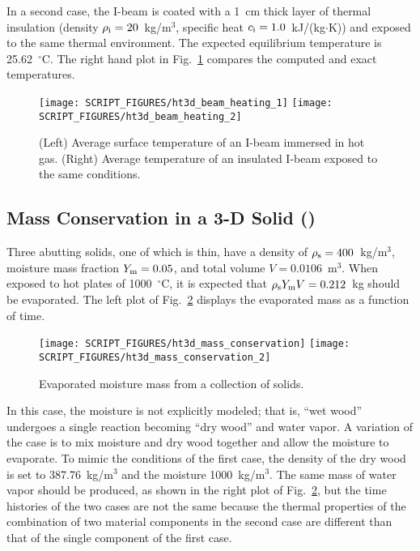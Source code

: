 \documentclass[11pt]{book}
\begin{document}
In a second case, the I-beam is coated with a 1~cm thick layer of thermal insulation (density $\rho_{\rm i}=20$~kg/m$^3$, specific heat $c_{\rm i}=1.0$~kJ/(kg$\cdot$K)) and exposed to the same thermal environment. The expected equilibrium temperature is 25.62~$^\circ$C. The right hand plot in Fig.~\ref{fig:ht3d_beam_heating} compares the computed and exact temperatures.

\begin{figure}[ht]
\texttt{[image: SCRIPT\_FIGURES/ht3d\_beam\_heating\_1]}
\texttt{[image: SCRIPT\_FIGURES/ht3d\_beam\_heating\_2]}
\caption[The  test cases]{(Left) Average surface temperature of an I-beam immersed in hot gas. (Right) Average temperature of an insulated I-beam exposed to the same conditions.}
\label{fig:ht3d_beam_heating}
\end{figure}

\FloatBarrier


\subsection{Mass Conservation in a 3-D Solid (\texorpdfstring{}{ht3d\_mass\_conservation})}
\label{ht3d_mass_conservation}

Three abutting solids, one of which is thin, have a density of $\rho_{\rm s}=400$~kg/m$^3$, moisture mass fraction $Y_{\rm m}=0.05$, and total volume $V=0.0106$~m$^3$. When exposed to hot plates of 1000~$^\circ$C, it is expected that $\rho_{\rm s} Y_{\rm m} V=0.212$~kg should be evaporated. The left plot of Fig.~\ref{fig:ht3d_mass_conservation} displays the evaporated mass as a function of time.

\begin{figure}[ht]
\texttt{[image: SCRIPT\_FIGURES/ht3d\_mass\_conservation]}
\texttt{[image: SCRIPT\_FIGURES/ht3d\_mass\_conservation\_2]}
\caption[The  test case]{Evaporated moisture mass from a collection of solids.}
\label{fig:ht3d_mass_conservation}
\end{figure}

In this case, the moisture is not explicitly modeled; that is, ``wet wood'' undergoes a single reaction becoming ``dry wood'' and water vapor. A variation of the case is to mix moisture and dry wood together and allow the moisture to evaporate. To mimic the conditions of the first case, the density of the dry wood is set to 387.76~kg/m$^3$ and the moisture 1000~kg/m$^3$. The same mass of water vapor should be produced, as shown in the right plot of Fig.~\ref{fig:ht3d_mass_conservation}, but the time histories of the two cases are not the same because the thermal properties of the combination of two material components in the second case are different than that of the single component of the first case.
\end{document}
